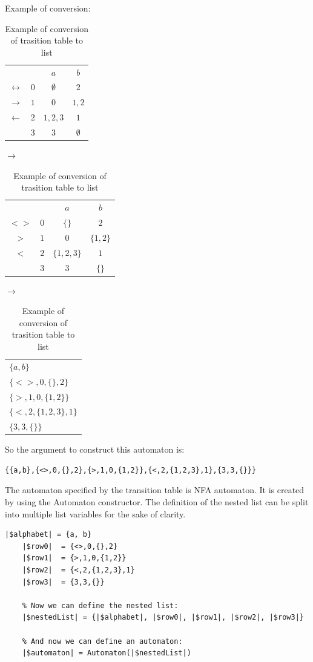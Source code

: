 \documentclass{ctuthesis}
\begin{document}
Example of conversion:
\begin{table}[H]
\begin{ctucolortab}
\begin{tabular}{cc|cc}
	&	& $a$	& $b$ \\\Midrule
$\leftrightarrow$	& $0$	& $\emptyset$	& $2$ \\
$\rightarrow$	& $1$ & $0$ & $1,2$ \\
$\leftarrow$	& $2$ & $1,2,3$ & $1$ \\
				& $3$ & $3$	& $\emptyset$ 
\end{tabular}
\quad
$\rightarrow$
\begin{tabular}{|c|c|c|c|}
\hline
	&&$a$&$b$ \\
	$<>$ & $0$ & $\{\}$ & $2$ \\
	$>$ & $1$ & $0$ & $\{1,2\}$ \\
	$<$ & $2$ & $\{1,2,3\}$ & $1$ \\
		& $3$ & $3$ & $\{\}$\\
		\hline
\end{tabular}
\quad 
$\rightarrow$
\begin{tabular}{|l|}
\hline 
$\{a, b\}$ \\
$\{<>,0,\{\}, 2\}$ \\
$\{>,1,0,\{1,2\}\}$ \\
$\{<,2,\{1,2,3\},1\}$ \\
$\{3, 3, \{\}\}$ \\\hline
\end{tabular}
\end{ctucolortab}
\caption{Example of conversion of trasition table to list}
\label{fig:example_conversion}
\end{table}

So the argument to construct this automaton is:
\begin{lstlisting}[language = JASL_snippet]
	{{a,b},{<>,0,{},2},{>,1,0,{1,2}},{<,2,{1,2,3},1},{3,3,{}}}
\end{lstlisting}

The automaton specified by the transition table is NFA automaton. It is created by using the Automaton constructor. The definition of the nested list can be split into multiple list variables for the sake of clarity. 

\begin{minipage}{\linewidth}
\begin{lstlisting}[language = JASL]
	|$alphabet| = {a, b}
	|$row0|  = {<>,0,{},2}
	|$row1|  = {>,1,0,{1,2}}
	|$row2|  = {<,2,{1,2,3},1}
	|$row3|  = {3,3,{}}
	
	% Now we can define the nested list:
	|$nestedList| = {|$alphabet|, |$row0|, |$row1|, |$row2|, |$row3|}
    
	% And now we can define an automaton:
	|$automaton| = Automaton(|$nestedList|)
\end{lstlisting}
\end{minipage}
\end{document}
